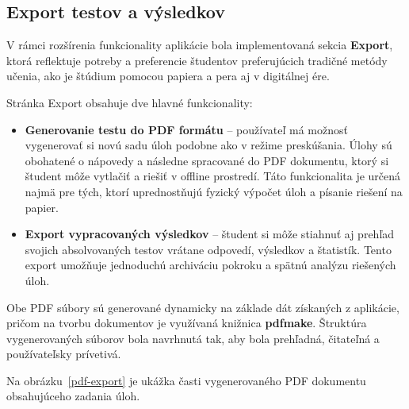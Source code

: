 \subsection{Export testov a výsledkov}

V rámci rozšírenia funkcionality aplikácie bola implementovaná sekcia \textbf{Export}, ktorá reflektuje potreby a preferencie študentov preferujúcich tradičné metódy učenia, ako je štúdium pomocou papiera a pera aj v digitálnej ére.

Stránka Export obsahuje dve hlavné funkcionality:

\begin{itemize}
    \item \textbf{Generovanie testu do PDF formátu} – používateľ má možnosť vygenerovať si novú sadu úloh podobne ako v režime preskúšania.
     Úlohy sú obohatené o nápovedy a následne spracované do PDF dokumentu, ktorý si študent môže vytlačiť a riešiť v offline prostredí.
      Táto funkcionalita je určená najmä pre tých, ktorí uprednostňujú fyzický výpočet úloh a písanie riešení na papier.

    \item \textbf{Export vypracovaných výsledkov} – študent si môže stiahnuť aj prehľad svojich absolvovaných testov vrátane odpovedí, výsledkov a štatistík.
     Tento export umožňuje jednoduchú archiváciu pokroku a spätnú analýzu riešených úloh.
\end{itemize}

Obe PDF súbory sú generované dynamicky na základe dát získaných z aplikácie, pričom na tvorbu dokumentov je využívaná knižnica \textbf{pdfmake}.
 Štruktúra vygenerovaných súborov bola navrhnutá tak, aby bola prehľadná, čitateľná a používateľsky prívetivá.

Na obrázku~\ref{pdf-export} je ukážka časti vygenerovaného PDF dokumentu obsahujúceho zadania úloh.

